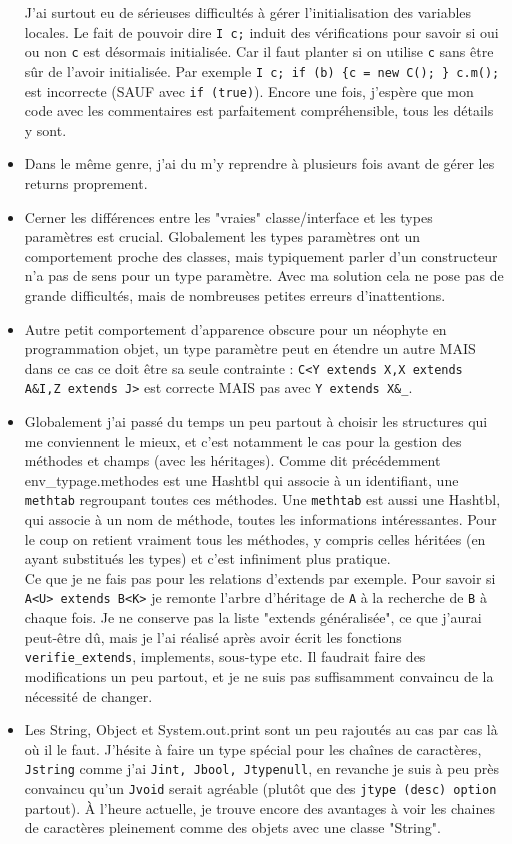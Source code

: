 \documentclass[12pt,a4paper]{report}
\begin{document}
\begin{itemize}[label=\textbullet]
J'ai surtout eu de sérieuses difficultés à gérer l'initialisation des variables locales. Le fait de pouvoir dire \texttt{I c;} induit des vérifications pour savoir si oui ou non \texttt{c} est désormais initialisée. Car il faut planter si on utilise \texttt{c} sans être sûr de l'avoir initialisée. Par exemple \texttt{I c; if (b) \{c = new C(); \} c.m();} est incorrecte (SAUF avec \texttt{if (true)}). Encore une fois, j'espère que mon code avec les commentaires est parfaitement compréhensible, tous les détails y sont.
\item Dans le même genre, j'ai du m'y reprendre à plusieurs fois avant de gérer les returns proprement.
\item Cerner les différences entre les "vraies" classe/interface et les types paramètres est crucial. Globalement les types paramètres ont un comportement proche des classes, mais typiquement parler d'un constructeur n'a pas de sens pour un type paramètre. Avec ma solution cela ne pose pas de grande difficultés, mais de nombreuses petites erreurs d'inattentions.
\item Autre petit comportement d'apparence obscure pour un néophyte en programmation objet, un type paramètre peut en étendre un autre MAIS dans ce cas ce doit être sa seule contrainte : \texttt{C<Y extends X,X extends A\&I,Z extends J>} est correcte MAIS pas avec \texttt{Y extends X\&\_}.
\item Globalement j'ai passé du temps un peu partout à choisir les structures qui me conviennent le mieux, et c'est notamment le cas pour la gestion des méthodes et champs (avec les héritages). Comme dit précédemment env\_typage.methodes est une Hashtbl qui associe à un identifiant, une \texttt{methtab} regroupant toutes ces méthodes. Une \texttt{methtab} est aussi une Hashtbl, qui associe à un nom de méthode, toutes les informations intéressantes. Pour le coup on retient vraiment tous les méthodes, y compris celles héritées (en ayant substitués les types) et c'est infiniment plus pratique. \\ Ce que je ne fais pas pour les relations d'extends par exemple. Pour savoir si \texttt{A<U> extends B<K>} je remonte l'arbre d'héritage de \texttt{A} à la recherche de \texttt{B} à chaque fois. Je ne conserve pas la liste "extends généralisée", ce que j'aurai peut-être dû, mais je l'ai réalisé après avoir écrit les fonctions \texttt{verifie\_extends}, implements, sous-type etc. Il faudrait faire des modifications un peu partout, et je ne suis pas suffisamment convaincu de la nécessité de changer. 
\item Les String, Object et System.out.print sont un peu rajoutés au cas par cas là où il le faut. J'hésite à faire un type spécial pour les chaînes de caractères, \texttt{Jstring} comme j'ai \texttt{Jint, Jbool, Jtypenull}, en revanche je suis à peu près convaincu qu'un \texttt{Jvoid} serait agréable (plutôt que des \texttt{jtype (desc) option} partout). À l'heure actuelle, je trouve encore des avantages à voir les chaines de caractères pleinement comme des objets avec une classe "String".

\end{itemize}
\end{document}
